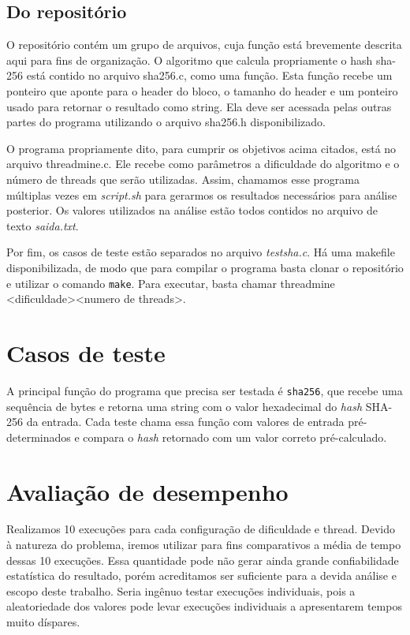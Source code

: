 \documentclass[12pt]{article}
\begin{document}
\subsection{Do repositório}
O repositório contém um grupo de arquivos, cuja função está brevemente descrita aqui para fins de organização. O algoritmo que calcula propriamente o hash sha-256 está contido no arquivo \textmd{sha256.c}, como uma função. Esta função recebe um ponteiro que aponte para o header do bloco, o tamanho do header e um ponteiro usado para retornar o resultado como string. Ela deve ser acessada pelas outras partes do programa utilizando o arquivo \textmd{sha256.h} disponibilizado.

O programa propriamente dito, para cumprir os objetivos acima citados, está no arquivo \textmd{threadmine.c}. Ele recebe como parâmetros a dificuldade do algoritmo e o número de threads que serão utilizadas. Assim, chamamos esse programa múltiplas vezes em \textsl{script.sh} para gerarmos os resultados necessários para análise posterior. Os valores utilizados na análise estão todos contidos no arquivo de texto \textsl{saida.txt}.

Por fim, os casos de teste estão separados no arquivo \textsl{testsha.c}. Há uma makefile disponibilizada, de modo que para compilar o programa basta clonar o repositório e utilizar o comando \texttt{make}. Para executar, basta chamar threadmine \textless dificuldade\textgreater\space\textless numero de threads\textgreater.

\section{Casos de teste}
A principal função do programa que
precisa ser testada é \texttt{sha256},
que recebe uma sequência de bytes e
retorna uma string com o valor hexadecimal
do \textit{hash} SHA-256 da entrada.
Cada teste chama essa função com
valores de entrada pré-determinados e
compara o \textit{hash} retornado
com um valor correto pré-calculado.

\section{Avaliação de desempenho}
Realizamos 10 execuções para cada configuração de dificuldade e thread. Devido à natureza do problema, iremos utilizar para fins comparativos a média de tempo dessas 10 execuções. Essa quantidade pode não gerar ainda grande confiabilidade estatística do resultado, porém acreditamos ser suficiente para a devida análise e escopo deste trabalho. Seria ingênuo testar execuções individuais, pois a aleatoriedade dos valores pode levar execuções individuais a apresentarem tempos muito díspares.
\end{document}
